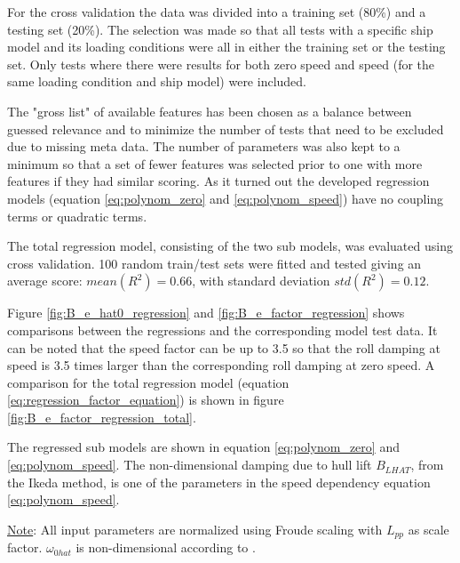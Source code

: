 For the cross validation the data was divided into a  training set (80\%) and a testing set (20\%). The selection was made so that all tests with a specific ship model and its loading conditions were all in either the training set or the testing set. Only tests where there were results for both zero speed and speed (for the same loading condition and ship model) were included.

The "gross list" of available features has been chosen as a balance between guessed relevance and to minimize the number of tests that need to be excluded due to missing meta data. 
The number of parameters was also kept to a minimum so that a set of fewer features was selected prior to one with more features if they had similar scoring. As it turned out the developed regression models (equation \ref{eq:polynom_zero} and \ref{eq:polynom_speed}) have no coupling terms or quadratic terms.

The total regression model, consisting of the two sub models, was evaluated using cross validation. 100 random train/test sets were fitted and tested giving an average score: $mean(R^2)=0.66$, with standard deviation $std(R^2)=0.12$.

Figure \ref{fig:B_e_hat0_regression} and \ref{fig:B_e_factor_regression} shows comparisons between the regressions and the corresponding model test data. It can be noted that the speed factor can be up to 3.5 so that the roll damping at speed is 3.5 times larger than the corresponding roll damping at zero speed. A comparison for the total regression model (equation \ref{eq:regression_factor_equation}) is shown in figure \ref{fig:B_e_factor_regression_total}.

 The regressed sub models are shown in equation \ref{eq:polynom_zero} and \ref{eq:polynom_speed}. The non-dimensional damping due to hull lift $B_{LHAT}$, from the Ikeda method, is one of the parameters in the speed dependency equation \ref{eq:polynom_speed}.



{\footnotesize \underline{Note}: All input parameters are normalized using Froude scaling with $L_{pp}$ as scale factor. $\omega_{0hat}$ is non-dimensional according to \parencite{himeno_prediction_1981}.} 

